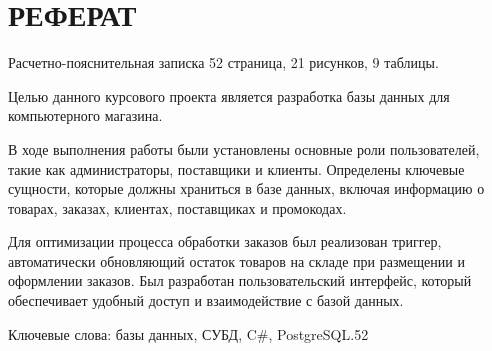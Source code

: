 \chapter*{РЕФЕРАТ}

Расчетно-пояснительная записка 52 страница, 21 рисунков, 9 таблицы. 

Целью данного курсового проекта является разработка базы данных для компьютерного магазина.

В ходе выполнения работы были установлены основные роли пользователей, такие как администраторы, поставщики и клиенты. Определены ключевые сущности, которые должны храниться в базе данных, включая информацию о товарах, заказах, клиентах, поставщиках и промокодах.

Для оптимизации процесса обработки заказов был реализован триггер, автоматически обновляющий остаток товаров на складе при размещении и оформлении заказов. Был разработан пользовательский интерфейс, который обеспечивает удобный доступ и взаимодействие с базой данных.

Ключевые слова: базы данных, СУБД, C\#, PostgreSQL.52